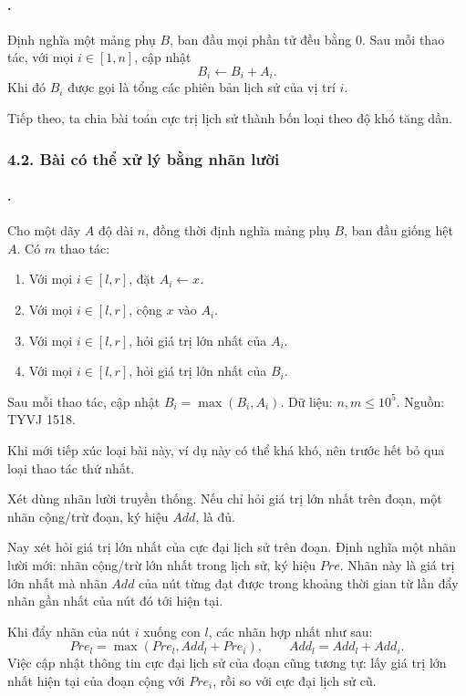\documentclass[11pt]{article}
\begin{document}
\paragraph{.}
Định nghĩa một mảng phụ \(B\), ban đầu mọi phần tử đều bằng \(0\). Sau mỗi
thao tác, với mọi \(i\in[1,n]\), cập nhật
\[
  B_i\leftarrow B_i+A_i.
\]
Khi đó \(B_i\) được gọi là tổng các phiên bản lịch sử của vị trí \(i\).

Tiếp theo, ta chia bài toán cực trị lịch sử thành bốn loại theo độ khó tăng
dần.

\subsubsection*{4.2. Bài có thể xử lý bằng nhãn lười}

\paragraph{.}
Cho một dãy \(A\) độ dài \(n\), đồng thời định nghĩa mảng phụ \(B\), ban đầu
giống hệt \(A\). Có \(m\) thao tác:
\begin{enumerate}
  \item Với mọi \(i\in[l,r]\), đặt \(A_i\leftarrow x\).
  \item Với mọi \(i\in[l,r]\), cộng \(x\) vào \(A_i\).
  \item Với mọi \(i\in[l,r]\), hỏi giá trị lớn nhất của \(A_i\).
  \item Với mọi \(i\in[l,r]\), hỏi giá trị lớn nhất của \(B_i\).
\end{enumerate}
Sau mỗi thao tác, cập nhật \(B_i=\max(B_i,A_i)\). Dữ liệu:
\(n,m\le 10^5\). Nguồn: TYVJ 1518.

Khi mới tiếp xúc loại bài này, ví dụ này có thể khá khó, nên trước hết bỏ qua
loại thao tác thứ nhất.

Xét dùng nhãn lười truyền thống. Nếu chỉ hỏi giá trị lớn nhất trên đoạn, một
nhãn cộng/trừ đoạn, ký hiệu \(\mathit{Add}\), là đủ.

Nay xét hỏi giá trị lớn nhất của cực đại lịch sử trên đoạn. Định nghĩa một
nhãn lười mới: nhãn cộng/trừ lớn nhất trong lịch sử, ký hiệu \(\mathit{Pre}\).
Nhãn này là giá trị lớn nhất mà nhãn \(\mathit{Add}\) của nút từng đạt được
trong khoảng thời gian từ lần đẩy nhãn gần nhất của nút đó tới hiện tại.

Khi đẩy nhãn của nút \(i\) xuống con \(l\), các nhãn hợp nhất như sau:
\[
  \mathit{Pre}_l=\max(\mathit{Pre}_l,\mathit{Add}_l+\mathit{Pre}_i),
  \qquad
  \mathit{Add}_l=\mathit{Add}_l+\mathit{Add}_i.
\]
Việc cập nhật thông tin cực đại lịch sử của đoạn cũng tương tự: lấy giá trị
lớn nhất hiện tại của đoạn cộng với \(\mathit{Pre}_i\), rồi so với cực đại
lịch sử cũ.
\end{document}
